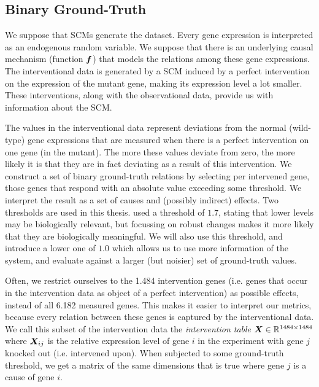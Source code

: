 \subsection{Binary Ground-Truth}
We suppose that SCMs generate the dataset. Every gene expression is interpreted as an endogenous random variable. We suppose that there is an underlying causal mechanism (function $\bm{f}$) that models the relations among these gene expressions. The interventional data is generated by a SCM induced by a perfect intervention on the expression of the mutant gene, making its expression level a lot smaller. These interventions, along with the observational data, provide us with information about the SCM. 

The values in the interventional data represent deviations from the normal (wild-type) gene expressions that are measured when there is a perfect intervention on one gene (in the mutant). The more these values deviate from zero, the more likely it is that they are in fact deviating as a result of this intervention. We construct a set of binary ground-truth relations by selecting per intervened gene, those genes that respond with an absolute value exceeding some threshold. We interpret the result as a set of causes and (possibly indirect) effects. Two thresholds are used in this thesis. \citet{kemmeren2014large} used a threshold of $1.7$, stating that lower levels may be biologically relevant, but focussing on robust changes makes it more likely that they are biologically meaningful. We will also use this threshold, and introduce a lower one of $1.0$ which allows us to use more information of the system, and evaluate against a larger (but noisier) set of ground-truth values. 

Often, we restrict ourselves to the 1.484 intervention genes (i.e. genes that occur in the intervention data as object of a perfect intervention) as possible effects, instead of all 6.182 measured genes. This makes it easier to interpret our metrics, because every relation between these genes is captured by the interventional data. We call this subset of the intervention data the \textit{intervention table} $\bm{X} \in \mathbb{R}^{1484\times 1484}$ where $\bm{X}_{ij}$ is the relative expression level of gene $i$ in the experiment with gene $j$ knocked out (i.e. intervened upon). When subjected to some ground-truth threshold, we get a matrix of the same dimensions that is true where gene $j$ is a cause of gene $i$.

